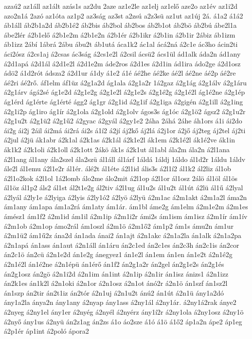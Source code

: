 {azaú2
az1áll
az1ált
azás1s
az2du
2aze
az1e2le
az1elj
az1elő
aze2o
az1év
az1i2d
azo2n1á
2azó
az1óta
az1p2
az3ság
az3st
a2zsú
a2z3sü
az1ut
az1új
2á.
á1a2
á1á2
áb1áll
áb2b1a2d
áb2b1é2
áb2bis
áb2bol
áb2bos
áb2b1ot
áb2bö
áb2bú
ábe2l1a
ábe2lér
á2b1elő
á2b1e2m
á2b1e2n
á2b1ér
á2b1ikr
á2b1in
á2b1ir
2ábiz
áb1izm
áb1izz
2ábí
1ábrá
2ábu
ábu2t
áb1utá
áca1k2
ác1al
ácá2ná
á2c1e
ác3ho
ácin2ti
áci2ósz
á2cs1aj
á2csas
ác3ság
á2cs1e2l
á2csil
ácsü2
ács1ül
ád1alk
áda2n
ád1any
á2d1apá
á2d1ál
á2d1e2l
á2d1e2m
áde2ros
á2d1es
á2d1in
ád1ira
ádo2ge
á2d1osz
ádö2
á1d2rót
ádsza2
á2d1ur
á1dy
á1e2
á1é
áé2he
áé2ke
áé2l
áé2ne
áé2p
áé2re
áé2ri
áé2rő.
áf1elm
áf1üz
á2g1a2d
ág1ala
á2g1a2r
1á2gaz
á2g1ág
á2g1álv
á2g1áru
á2g1árv
ágá2sé
ág1e2d
á2g1e2g
á2g1e2l
á2g1e2s
á2g1é2g
á2g1é2l
ág1é2ne
á2g1ép
ág1érd
ág1érte
ág1érté
ágg2
ág1gr
á2g1id
á2g1if
á2g1iga
á2gigén
á2g1ill
á2g1ing
á2g1i2p
ág1iro
ág1ír
á2g1ola
á2g1old
á2g1olv
ágos3s
ág1óc
á2g1ö2
ágsz2
á2g1u2r
á2g1u2t
á2g1ü2
á2g1ű2
á2gyac
á2gyál
á2gy1e2
2áha
2áhá
2áhe
áh1ors
á1i
ái2do
ái2g
ái2j
2áil
ái2má
ái2rá
ái2s
á1í2
á2jí
áj2kő
áj2lá
á2j1or
á2jő
áj2teg
áj2tel
áj2ti
á2jul
á2jü
ák1abr
á2k1al
á2k1as
á2k1ál
á2k1e2l
ák1em
á2k1é2l
ák1é2ve
ák1in
ák1k2
á2k1oli
á2k1oll
á2k1ott
2ákö
ák1s
á2k1ut
ál1abl
ála2m
ála2n
á2l1ana
á2l1ang
ál1any
ála2szel
ála2szü
ál1áll
ál1árf
1áldá
1áldj
1áldo
ál1d2r
1áldu
1áldv
ále2l
ál1emu
á2l1e2r
ál1ér.
álé2t
ál1éte
á2l1id
ális3s
á2l1í2
ál1k2
ál2liz
ál1ob
á2l1o2kok
á2l1ol
1á2lomb
álo2me
álo2mit
á2l1op
á2l1or
ál1osz
2álö
ál1öl
ál1ös
ál1öz
ál1p2
áls2
ál1st
ál2t1e2g
ál2tiv
á2l1ug
ál1u2s
ál1u2t
ál1út
á2lü
ál1ű
á2lyal
á2lyál
á2ly1e
á2lyiga
á2lyis
á2ly1ó2
á2lyö
á2lyü
á2m1ac
á2m1akt
á2m1a2l
áma2n
ám1any
ám1apa
ám1a2rá
ám1aty
ám1ár.
ám1bl
áme2g
ám1elm
á2m1e2m
á2m1es
ámész1
ám1f2
á2m1id
ám1il
á2m1ip
á2m1i2r
ámi2s
ám1ism
ám1isz
á2m1ír
ám1ív
á2m1ob
á2m1op
ámo2rál
ám1oszl
á2m1ö
á2m1ő2
ám1p2
ám1s
ámu2n
ám1ur
á2m1ü2
ám1ű2z
ána2d
án1ada
ánai2
án1ajt
á2n1akc
á2n1a2la
án1alk
á2n1a2pa
á2n1apá
án1ass
án1aut
á2n1áll
án1áru
án2c1ed
án2c1es
án2c3h
án2c1is
án2cor
án2c1ö
án2cü
á2n1e2d
án1e2g
ánegyez1
án1e2l
án1em
án1en
án1e2t
á2n1é2g
á2n1é2l
án1é2ne
á2n1épü
án1érő
án1f2
án2g1a2r
án2gel
án2g1e2s
án2g1és
án2g1osz
án2gö
á2n1i2d
á2n1im
án1int
á2n1ip
á2n1ir
án1isz
ánizs1
á2n1izz
án2k1es
án1k2l
á2n1oki
á2n1or
á2n1osz
á2n1ot
ánó2r
á2n1ö
án1szf
án1sz2l
án1szp
án2tir
án2t1iz
án2tór
á2n1uj
á2n1u2t
ánú2
án1út
á2n1ü
ány1a2dó
ány1a2la
ánya2n
ány1any
á2nyap
ány1ass
á2ny1ál
á2ny1ár.
á2ny1á2rak
ánye2
á2nyeg
á2ny1el
ány1er
á2nyég
á2nyél
á2nyérz
ány1í2r
á2ny1ola
á2ny1osz
á2ny1ö
á2nyő
ány1us
á2nyü
án2z1ag
án2zs
á1o
áo2sze
á1ó
á1ö
á1ő2
áp1a2n
ápe2
áp1eg
á2p1ér
áp1int
á2poló
ápora2
}
